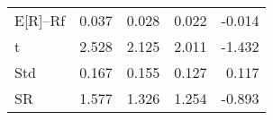 \begin{tabular}{lrrrr}
\toprule
\midrule
E[R]--Rf & 0.037 & 0.028 & 0.022 & -0.014 \\
t & 2.528 & 2.125 & 2.011 & -1.432 \\
Std & 0.167 & 0.155 & 0.127 & 0.117 \\
SR & 1.577 & 1.326 & 1.254 & -0.893 \\
\bottomrule
\end{tabular}
